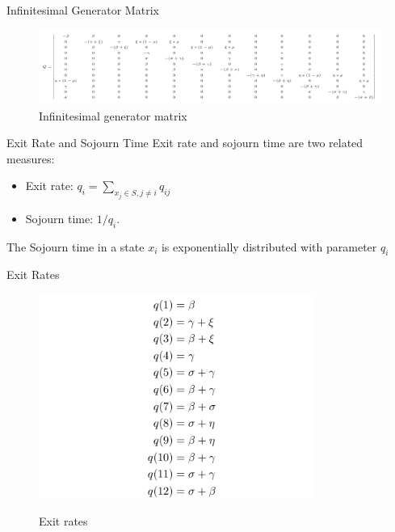 \documentclass[8pt]{beamer}
\begin{document}
    \begin{frame}{Infinitesimal Generator Matrix}
        \begin{figure}[h]
            \centering
            \includegraphics[width=1.0\textwidth]{Images/infinitesimal-generator-matrix.png}
            \caption{Infinitesimal generator matrix}
            \label{fig:infinitesimal-generator-matrix}
        \end{figure}
    \end{frame}
    
    \begin{frame}{Exit Rate and Sojourn Time}
        Exit rate and sojourn time are two related measures:
        \vspace{1cm}
        \begin{itemize}
            \item Exit rate: \( q_{i} = \sum\limits_{x_{j} \in S, j \neq i} q_{ij}\)
            \item Sojourn time: \( 1/q_{i}\). 
        \end{itemize}
        \vspace{1cm}
        The Sojourn time in a state \( x_{i}\) is exponentially distributed with parameter \( q_{i}\)
    \end{frame}

    \begin{frame}{Exit Rates}
        \begin{figure}[h]
            \centering
            \includegraphics[width=0.8\textwidth]{Images/exit-rates.png}
            \label{fig:exit-rates}
            \caption{Exit rates}
        \end{figure}
    \end{frame}
    
\end{document}
